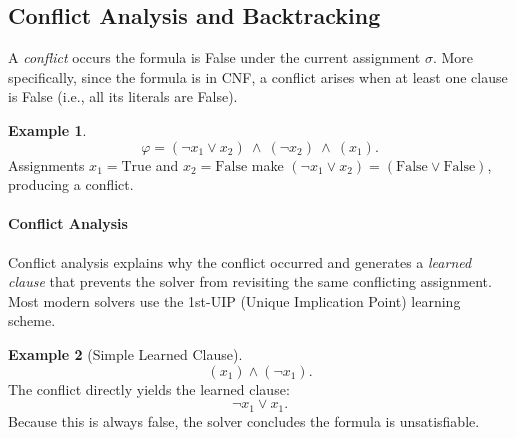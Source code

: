 \documentclass[oneside,11pt,dvipsnames]{book}
\numberwithin{equation}{section}
\theoremstyle{definition}
\newtheorem{example}{Example}[section]
\theoremstyle{remark}
\begin{document}
\subsection{Conflict Analysis and Backtracking}\label{sec:conflict-analysis}


A \emph{conflict} occurs the formula is False under the current assignment $\sigma$. More specifically, since the formula is in CNF, a conflict arises when at least one clause is False (i.e., all its literals are False).

\begin{example}
\[
\varphi = (\lnot x_1 \lor x_2)\ \land\ (\lnot x_2)\ \land\ (x_1).
\]
Assignments $x_1=\mathrm{True}$ and $x_2=\mathrm{False}$ make
$(\lnot x_1 \lor x_2) = (\text{False} \lor \text{False})$, producing a conflict.
\end{example}





\paragraph{Conflict Analysis}


Conflict analysis explains why the conflict occurred and generates a \emph{learned
clause} that prevents the solver from revisiting the same conflicting assignment.
Most modern solvers use the 1st-UIP (Unique Implication Point) learning scheme.

\begin{example}[Simple Learned Clause]
\[
(x_1) \land (\lnot x_1).
\]
The conflict directly yields the learned clause:
\[
\lnot x_1 \lor x_1.
\]
Because this is always false, the solver concludes the formula is unsatisfiable.
\end{example}
\end{document}

